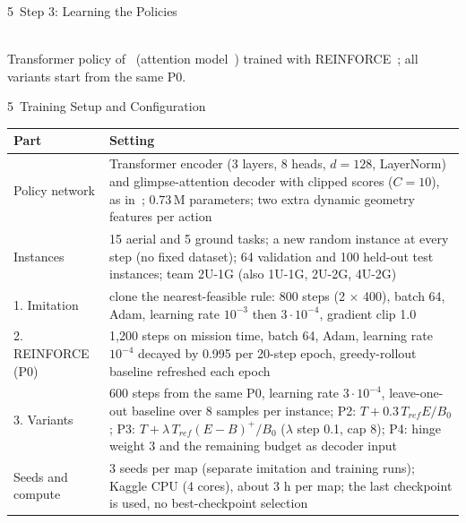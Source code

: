 \begin{frame}{5 \,Step 3: Learning the Policies}
\centering
{}\\[2mm]
{\small Transformer policy of~\cite{base} (attention model~\cite{kool}) trained with REINFORCE~\cite{williams}; all variants start from the same P0.}
\end{frame}

\begin{frame}{5 \,Training Setup and Configuration}
\centering\scriptsize
\renewcommand{\arraystretch}{1.3}
\begin{tabular}{@{}P{2.6cm}P{10.0cm}@{}}
\toprule
\textbf{Part} & \textbf{Setting}\\
\midrule
Policy network & Transformer encoder (3 layers, 8 heads, $d=128$, LayerNorm) and glimpse-attention decoder with clipped scores ($C=10$), as in~\cite{base}; 0.73\,M parameters; two extra dynamic geometry features per action\\
Instances & 15 aerial and 5 ground tasks; a new random instance at every step (no fixed dataset); 64 validation and 100 held-out test instances; team 2U-1G (also 1U-1G, 2U-2G, 4U-2G)\\
1. Imitation & clone the nearest-feasible rule: 800 steps (2 $\times$ 400), batch 64, Adam, learning rate $10^{-3}$ then $3\cdot10^{-4}$, gradient clip 1.0\\
2. REINFORCE (P0) & 1{,}200 steps on mission time, batch 64, Adam, learning rate $10^{-4}$ decayed by 0.995 per 20-step epoch, greedy-rollout baseline refreshed each epoch~\cite{williams}\\
3. Variants & 600 steps from the same P0, learning rate $3\cdot10^{-4}$, leave-one-out baseline over 8 samples per instance; P2: $T+0.3\,T_{ref}E/B_0$; P3: $T+\lambda\,T_{ref}(E-B)^+/B_0$ ($\lambda$ step 0.1, cap 8); P4: hinge weight 3 and the remaining budget as decoder input\\
Seeds and compute & 3 seeds per map (separate imitation and training runs); Kaggle CPU (4 cores), about 3 h per map; the last checkpoint is used, no best-checkpoint selection\\
\bottomrule
\end{tabular}
\end{frame}

